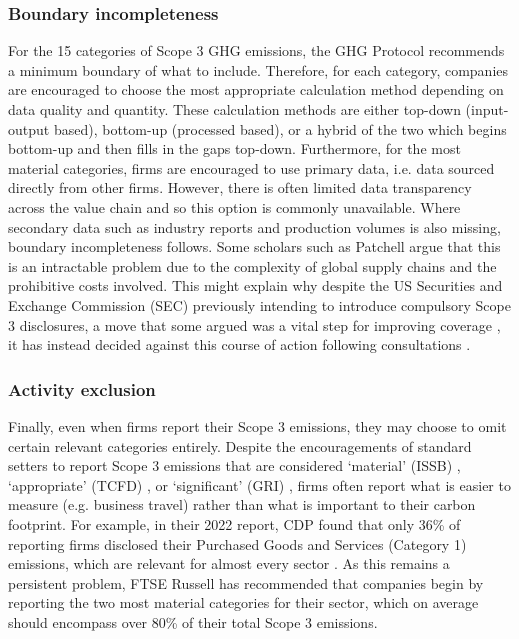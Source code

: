 \documentclass[12pt,twoside]{report}
\begin{document}
\subsubsection{Boundary incompleteness}

For the 15 categories of Scope 3 GHG emissions, the GHG Protocol recommends a minimum boundary of what to include. Therefore, for each category, companies are encouraged to choose the most appropriate calculation method depending on data quality and quantity. These calculation methods are either top-down (input-output based), bottom-up (processed based), or a hybrid of the two which begins bottom-up and then fills in the gaps top-down. Furthermore, for the most material categories, firms are encouraged to use primary data, i.e. data sourced directly from other firms. However, there is often limited data transparency across the value chain and so this option is commonly unavailable. Where secondary data such as industry reports and production volumes is also missing, boundary incompleteness follows. Some scholars such as Patchell \cite{patchell2018} argue that this is an intractable problem due to the complexity of global supply chains and the prohibitive costs involved. This might explain why despite the US Securities and Exchange Commission (SEC) previously intending to introduce compulsory Scope 3 disclosures, a move that some argued was a vital step for improving coverage \cite{lgim2023}, it has instead decided against this course of action following consultations \cite{sec2024}.

\subsubsection{Activity exclusion}

Finally, even when firms report their Scope 3 emissions, they may choose to omit certain relevant categories entirely. Despite the encouragements of standard setters to report Scope 3 emissions that are considered `material' (ISSB) \cite{ifrs2023}, `appropriate' (TCFD) \cite{tcfd2021}, or `significant' (GRI) \cite{gri2016},  firms often report what is easier to measure (e.g. business travel) rather than what is important to their carbon footprint. For example, in their 2022 report, CDP found that only 36\% of reporting firms disclosed their Purchased Goods and Services (Category 1) emissions, which are relevant for almost every sector \cite{cdp2022}. As this remains a persistent problem, FTSE Russell \cite{ftserussell2024} has recommended that companies begin by reporting the two most material categories for their sector, which on average should encompass over 80\% of their total Scope 3 emissions. 
\end{document}
